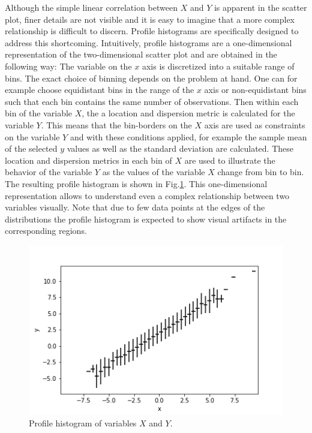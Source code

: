 \documentclass[BCOR=1mm, DIV=calc,10pt,
twoside=true,
twocolumn,
headings=normal]{scrartcl}
\newcommand{\fig}{Fig.}
\begin{document}
Although the simple linear correlation between $X$ and $Y$ is apparent in the scatter plot, finer details are not visible and it is easy to imagine that a more complex relationship is difficult to discern. Profile histograms are specifically designed to address this shortcoming. Intuitively, profile histograms are a one-dimensional representation of the two-dimensional scatter plot and are obtained  in the following way: The variable on the $x$ axis is discretized into a suitable range of bins. The exact choice of binning depends on the problem at hand. One can for example choose equidistant bins in the range of the $x$ axis or non-equidistant bins such that each bin contains the same number of observations. Then within each bin of the variable $X$, the a location and dispersion metric is calculated for the variable $Y$. This means that the bin-borders on the $X$ axis are used as constraints on the variable $Y$ and with these conditions applied, for example the sample mean of the selected $y$ values as well as the standard deviation are calculated. These location and dispersion metrics in each bin of $X$ are used to illustrate the behavior of the variable $Y$ as the values of the variable $X$ change from bin to bin. The resulting profile histogram is shown in \fig \ref{fig:profile}. This one-dimensional representation allows to understand even a complex relationship between two variables visually. Note that due to few data points at the edges of the distributions the profile histogram is expected to show visual artifacts in the corresponding regions.

 \begin{figure}
\begin{center}
\includegraphics[scale=0.5]{../figures/profile}
\caption{\label{fig:profile} Profile histogram of variables $X$ and $Y$.}
\end{center}
\end{figure}
\end{document}
